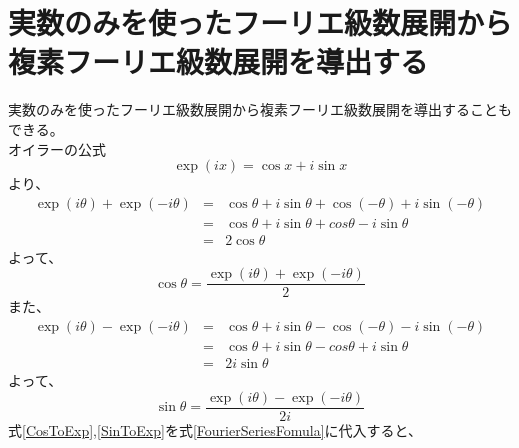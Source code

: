\documentclass[a4paper]{jsarticle}
\begin{document}
\section{実数のみを使ったフーリエ級数展開から複素フーリエ級数展開を導出する}
実数のみを使ったフーリエ級数展開から複素フーリエ級数展開を導出することもできる。\\
オイラーの公式
\begin{equation}
\exp \left( ix \right) = \cos x + i \sin x
\end{equation}
より、
\begin{eqnarray}
	\exp \left( i \theta \right) + \exp \left( -i \theta \right) &=& \cos \theta + i \sin \theta + \cos \left( - \theta \right) + i \sin \left( - \theta \right) \nonumber \\
	&=& \cos \theta + i \sin \theta + cos \theta - i \sin \theta \nonumber \\
	&=& 2 \cos \theta
\end{eqnarray}
よって、
\begin{equation}
\label{CosToExp}
\cos \theta = \frac { \exp \left( i \theta \right) + \exp \left( -i \theta \right) } { 2 }
\end{equation}
また、
\begin{eqnarray}
	\exp \left( i \theta \right) - \exp \left( -i \theta \right) &=& \cos \theta + i \sin \theta - \cos \left( - \theta \right) - i \sin \left( - \theta \right) \nonumber \\
	&=& \cos \theta + i \sin \theta - cos \theta + i \sin \theta \nonumber \\
	&=& 2i \sin \theta
\end{eqnarray}
よって、
\begin{equation}
\label{SinToExp}
\sin \theta = \frac { \exp \left( i \theta \right) - \exp \left( -i \theta \right) } { 2i }
\end{equation}
式\ref{CosToExp},\ref{SinToExp}を式\ref{FourierSeriesFomula}に代入すると、
\end{document}
